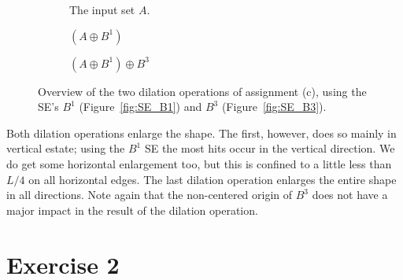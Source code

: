 \documentclass{article}
\begin{document}
\begin{figure}[H]
     \centering
     \begin{subfigure}[b]{0.27\textwidth}
         \centering
         
         \caption{The input set $A$.}
         \label{fig:ex1_c-inputset}
     \end{subfigure}
     \hfill
     \begin{subfigure}[b]{0.29\textwidth}
         \centering
         
         \caption{$(A \oplus B^1)$}
         \label{fig:ex1_c-step1}
     \end{subfigure}
     \hfill
     \begin{subfigure}[b]{0.37\textwidth}
         \centering
         
         \caption{$(A \oplus B^1) \oplus B^3$}
         \label{fig:ex1_c-step2}
     \end{subfigure}
     
    \caption{Overview of the two dilation operations of assignment (c), using the SE's $B^1$ (Figure~\ref{fig:SE_B1}) and $B^3$ (Figure~\ref{fig:SE_B3}).}
    \label{fig:ex1_c}
\end{figure}

Both dilation operations enlarge the shape. The first, however, does so mainly in vertical estate; using the $B^1$ SE the most hits occur in the vertical direction. We do get some horizontal enlargement too, but this is confined to a little less than $L/4$ on all horizontal edges. The last dilation operation enlarges the entire shape in all directions. Note again that the non-centered origin of $B^3$ does not have a major impact in the result of the dilation operation.

\section*{Exercise 2}
\end{document}
